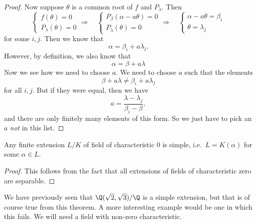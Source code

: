 \documentclass[a4paper]{article}
\begin{document}
\begin{proof}
  Now suppose $\theta$ is a common root of $f$ and $P_\lambda$. Then
  \[
    \begin{cases}
      f(\theta) = 0\\
      P_\lambda(\theta) = 0
    \end{cases}
    \Rightarrow\quad
    \begin{cases}
      P_\beta(\alpha - a\theta) = 0\\
      P_\lambda(\theta) = 0
    \end{cases}
    \Rightarrow\quad
    \begin{cases}
      \alpha - a\theta = \beta_i\\
      \theta = \lambda_j
    \end{cases}
  \]
  for some $i, j$. Then we know that
  \[
    \alpha = \beta_i + a\lambda_j.
  \]
  However, by definition, we also know that
  \[
    \alpha = \beta + a\lambda
  \]
  Now we see how we need to choose $a$. We need to choose $a$ such that the elements
  \[
    \beta + a \lambda \not= \beta_i + a \lambda_j
  \]
  for all $i, j$. But if they were equal, then we have
  \[
    a = \frac{\lambda - \lambda_j}{\beta_i - \beta},
  \]
  and there are only finitely many elements of this form. So we just have to pick an $a$ \emph{not} in this list.
\end{proof}

\begin{cor}
  Any finite extension $L/K$ of field of characteristic $0$ is simple, i.e.\ $L = K(\alpha)$ for some $\alpha \in L$.
\end{cor}

\begin{proof}
  This follows from the fact that all extensions of fields of characteristic zero are separable.
\end{proof}

We have previously seen that $\Q(\sqrt{2}, \sqrt{3})/\Q$ is a simple extension, but that is of course true from this theorem. A more interesting example would be one in which this fails. We will need a field with non-zero characteristic.
\end{document}
